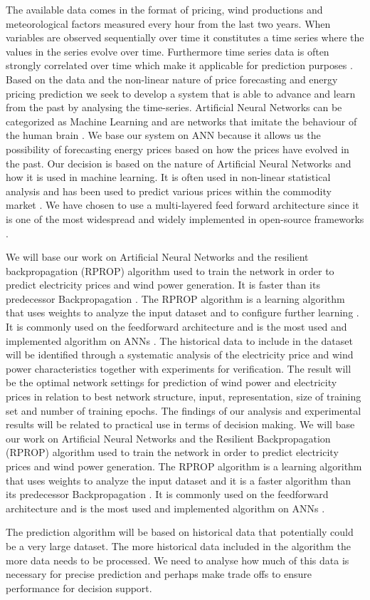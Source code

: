 The available data comes in the format of pricing, wind productions and meteorological factors measured every hour from the last two years. When variables are observed sequentially over time it constitutes a time series where the values in the series evolve over time. Furthermore time series data is often strongly correlated over time which make it applicable for prediction purposes \cite[Chapter~7.1.2]{econometrics}. Based on the data and the non-linear nature of price forecasting and energy pricing prediction we seek to develop a system that is able to advance and learn from the past by analysing the time-series. Artificial Neural Networks can be categorized as Machine Learning \cite{18} and are networks that imitate the behaviour of the human brain \cite{1}. We base our system on ANN because it allows us the possibility of forecasting energy prices based on how the prices have evolved in the past. Our decision is based on the nature of Artificial Neural Networks and how it is used in machine learning. It is often used in non-linear statistical analysis \cite{16} and has been used to predict various prices within the commodity market \cite{2,3,stockForecasting,pjmForecast}. We have chosen to use a multi-layered feed forward architecture since it is one of the most widespread and widely implemented in open-source frameworks \cite{17}.

We will base our work on Artificial Neural Networks and the resilient backpropagation (RPROP) algorithm used to train the network in order to predict electricity prices and wind power generation. It is faster than its predecessor Backpropagation \cite{8,15}.  The RPROP algorithm is a learning algorithm that uses weights to analyze the input dataset and to configure further learning \cite{17}. It is commonly used on the feedforward architecture and is the most used and implemented algorithm on ANNs \cite{14,17}. The historical data to include in the dataset will be identified through a systematic analysis of the electricity price and wind power characteristics together with experiments for verification. The result will be the optimal network settings for prediction of wind power and electricity prices in relation to best network structure, input, representation, size of training set and number of training epochs. The findings of our analysis and experimental results will be related to practical use in terms of decision making. We will base our work on Artificial Neural Networks and the Resilient Backpropagation (RPROP) algorithm used to train the network in order to predict electricity prices and wind power generation. The RPROP algorithm is a learning algorithm that uses weights to analyze the input dataset\cite{17} and it is a faster algorithm than its predecessor Backpropagation \cite{8,15}. It is commonly used on the feedforward architecture and is the most used and implemented algorithm on ANNs \cite{14,17}.

The prediction algorithm will be based on historical data that potentially could be a very large dataset. The more historical data included in the algorithm the more data needs to be processed. We need to analyse how much of this data is necessary for precise prediction and perhaps make trade offs to ensure performance for decision support.